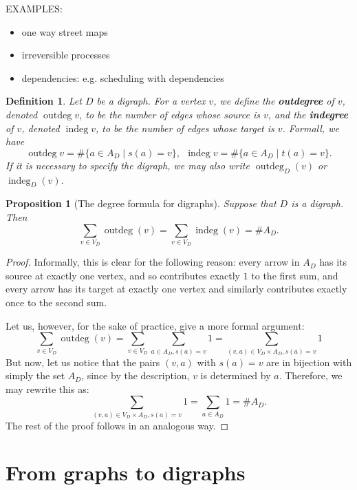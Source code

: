 \documentclass[12pt]{report}
\theoremstyle{plain}
\newtheorem{defn}[thm]{Definition}
\newtheorem{prop}[thm]{Proposition}
\newcommand{\oper}[1]{\operatorname{#1}}
\newcommand{\Xb}[1]{\textbf{#1}\index{#1}}
\begin{document}
EXAMPLES:
\begin{itemize}
\item one way street maps
\item irreversible processes
\item dependencies: e.g. scheduling with dependencies
\end{itemize}

\newcommand{\outdeg}{\oper{outdeg}}
\newcommand{\indeg}{\oper{indeg}}

\begin{defn} \label{inoutdegree}
Let $D$ be a digraph. For a vertex $v$, we define the \Xb{outdegree} of
$v$, denoted $\outdeg v$, to be the number of edges whose source is $v$,
and the \Xb{indegree} of $v$, denoted $\indeg v$, to be the number of edges
whose target is $v$.
Formall, we have
\[ \outdeg v = \#\{a \in A_D \mid  s(a) = v\} ,\ \ 
\indeg v = \#\{a \in A_D \mid t(a) = v\}.
\]
If it is necessary to specify the digraph, we may also write $\outdeg_D(v)$
or $\indeg_D(v)$.
\end{defn}

\begin{prop}[The degree formula for digraphs]
Suppose that $D$ is a digraph. Then 
\[\sum_{v \in V_D} \outdeg(v) = \sum_{v \in V_D} \indeg(v) = \#A_D.\]
\end{prop}
\begin{proof}
Informally, this is clear for the following reason: every arrow in $A_D$
has its source at exactly one vertex, and so contributes exactly $1$ to the
first sum, and every arrow has its target at exactly one vertex and
similarly contributes exactly once to the second sum.

Let us, however, for the sake of practice, give a more formal argument:
\[\sum_{v \in V_D} \outdeg(v) = \sum_{v \in V_D} \sum_{a \in A_D, s(a) = v}
1 = \sum_{(v, a) \in V_D \times A_D, s(a) = v} 1 \]
But now, let us notice that the pairs $(v, a)$ with $s(a) = v$ are in
bijection with simply the set $A_D$, since by the description, $v$ is
determined by $a$. Therefore, we may rewrite this as:
\[\sum_{(v, a) \in V_D \times A_D, s(a) = v} 1  = \sum_{a \in A_D} 1 =
\#A_D.\]
The rest of the proof follows in an analogous way.

\end{proof}

\section{From graphs to digraphs}
\end{document}

